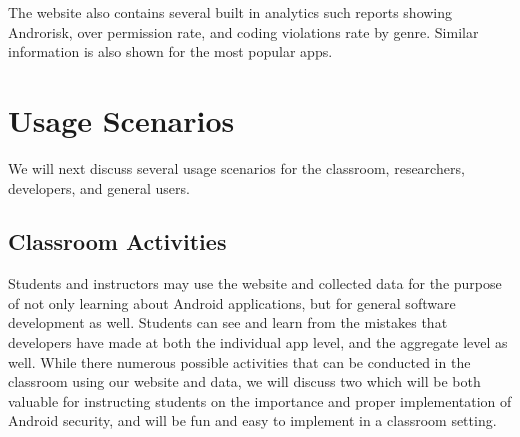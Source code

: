 \documentclass[journal,transmag]{IEEEtran}
\begin{document}
The website also contains several built in analytics such reports showing Androrisk, over permission rate, and coding violations rate by genre. Similar information is also shown for the most popular apps.












\section{Usage Scenarios}
\label{sec: usagescenarios}
We will next discuss several usage scenarios for the classroom, researchers, developers, and general users.




\subsection{Classroom Activities} %

Students and instructors may use the website and collected data for the purpose of not only learning about Android applications, but for general software development as well. Students can see and learn from the mistakes that developers have made at both the individual app level, and the aggregate level as well. While there numerous possible activities that can be conducted in the classroom using our website and data, we will discuss two which will be both valuable for instructing students on the importance and proper implementation of Android security, and will be fun and easy to implement in a classroom setting.


\end{document}
